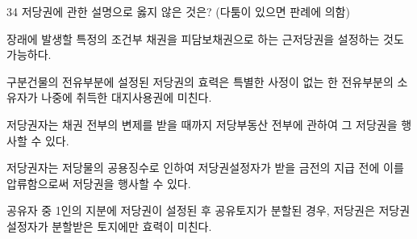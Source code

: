 \begin{question}{34}
저당권에 관한 설명으로 옳지 않은 것은? (다툼이 있으면 판례에 의함)
\begin{choices}
  \item 장래에 발생할 특정의 조건부 채권을 피담보채권으로 하는 근저당권을 설정하는 것도 가능하다.
  \item 구분건물의 전유부분에 설정된 저당권의 효력은 특별한 사정이 없는 한 전유부분의 소유자가 나중에 취득한 대지사용권에 미친다.
  \item 저당권자는 채권 전부의 변제를 받을 때까지 저당부동산 전부에 관하여 그 저당권을 행사할 수 있다.
  \item 저당권자는 저당물의 공용징수로 인하여 저당권설정자가 받을 금전의 지급 전에 이를 압류함으로써 저당권을 행사할 수 있다.
  \item 공유자 중 1인의 지분에 저당권이 설정된 후 공유토지가 분할된 경우, 저당권은 저당권설정자가 분할받은 토지에만 효력이 미친다.
\end{choices}
\end{question}
